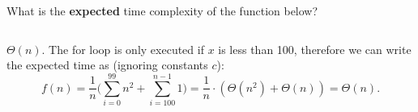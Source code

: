 \begin{prob}
    What is the \textbf{expected} time complexity of the function below?

    \inputminted{python}{./code.py}

    \begin{soln}
        $\Theta(n)$. The for loop is only executed if $x$ is less than 100, therefore we can write the expected time as 
        (ignoring constants $c$):
        \[ f(n) = \frac{1}{n} \bigg( \sum_{i = 0}^{99} n^2 + \sum_{i = 100}^{n - 1} 1 \bigg) = \frac{1}{n} \cdot (\Theta(n^2) + \Theta(n)) = \Theta(n). \]
    \end{soln}

\end{prob}
